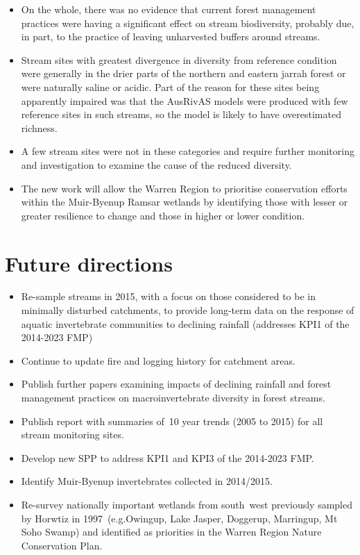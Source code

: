 \documentclass[version=last,
    paper=a4, %
    10pt, %
    usenames,
    dvipsnames,
    oneside, %
    headings=openany, %
    DIV=15 %
]{scrbook}
\begin{document}
\begin{itemize}
\itemsep1pt\parskip0pt
\item
  On the whole, there was no evidence that current forest management
  practices were having a significant effect on stream biodiversity,
  probably due, in part, to the practice of leaving unharvested buffers
  around streams.
\item
  Stream sites with greatest divergence in diversity from reference
  condition were generally in the drier parts of the northern and
  eastern jarrah forest or were naturally saline or acidic. Part of the
  reason for these sites being apparently impaired was that the AusRivAS
  models were produced with few reference sites in such streams, so the
  model is likely to have overestimated richness.
\item
  A few stream sites were not in these categories and require further
  monitoring and investigation to examine the cause of the reduced
  diversity.
\item
  The new work will allow the Warren Region to prioritise conservation
  efforts within the Muir-Byenup Ramsar wetlands by identifying those
  with lesser or greater resilience to change and those in higher or
  lower condition.
\end{itemize}




\section*{Future directions}

\begin{itemize}
\itemsep1pt\parskip0pt
\item
  Re-sample streams in 2015, with a focus on those considered to be in
  minimally disturbed catchments, to provide long-term data on the
  response of aquatic invertebrate communities to declining rainfall
  (addresses KPI1 of the 2014-2023 FMP)
\item
  Continue to update fire and logging history for catchment areas.
\item
  Publish further papers examining impacts of declining rainfall and
  forest management practices on macroinvertebrate diversity in forest
  streams.
\item
  Publish report with summaries of~10 year trends (2005 to 2015) for all
  stream monitoring sites.
\item
  Develop new SPP to address KPI1 and KPI3 of the 2014-2023 FMP.
\item
  Identify Muir-Byenup invertebrates collected in 2014/2015.
\item
  Re-survey nationally important wetlands from south~west previously
  sampled by Horwtiz in 1997~(e.g.Owingup, Lake Jasper, Doggerup,
  Marringup, Mt Soho Swamp) and identified as priorities in the Warren
  Region Nature Conservation Plan.
\end{itemize}



\end{document}
